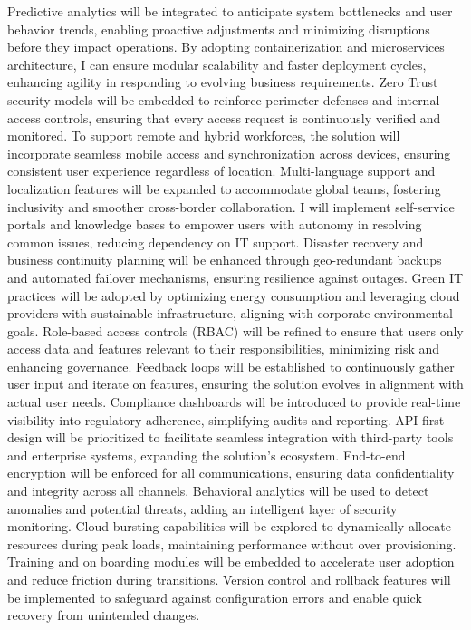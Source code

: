 Predictive analytics will be integrated to anticipate system bottlenecks and user behavior trends, enabling proactive adjustments and minimizing disruptions before they impact operations.
By adopting containerization and microservices architecture, I can ensure modular scalability and faster deployment cycles, enhancing agility in responding to evolving business requirements.
Zero Trust security models will be embedded to reinforce perimeter defenses and internal access controls, ensuring that every access request is continuously verified and monitored.
To support remote and hybrid workforces, the solution will incorporate seamless mobile access and synchronization across devices, ensuring consistent user experience regardless of location.
Multi-language support and localization features will be expanded to accommodate global teams, fostering inclusivity and smoother cross-border collaboration.
I will implement self-service portals and knowledge bases to empower users with autonomy in resolving common issues, reducing dependency on IT support.
Disaster recovery and business continuity planning will be enhanced through geo-redundant backups and automated failover mechanisms, ensuring resilience against outages.
Green IT practices will be adopted by optimizing energy consumption and leveraging cloud providers with sustainable infrastructure, aligning with corporate environmental goals.
Role-based access controls (RBAC) will be refined to ensure that users only access data and features relevant to their responsibilities, minimizing risk and enhancing governance.
Feedback loops will be established to continuously gather user input and iterate on features, ensuring the solution evolves in alignment with actual user needs.
Compliance dashboards will be introduced to provide real-time visibility into regulatory adherence, simplifying audits and reporting.
API-first design will be prioritized to facilitate seamless integration with third-party tools and enterprise systems, expanding the solution’s ecosystem.
End-to-end encryption will be enforced for all communications, ensuring data confidentiality and integrity across all channels.
Behavioral analytics will be used to detect anomalies and potential threats, adding an intelligent layer of security monitoring.
Cloud bursting capabilities will be explored to dynamically allocate resources during peak loads, maintaining performance without over provisioning.
Training and on boarding modules will be embedded to accelerate user adoption and reduce friction during transitions.
Version control and rollback features will be implemented to safeguard against configuration errors and enable quick recovery from unintended changes.
